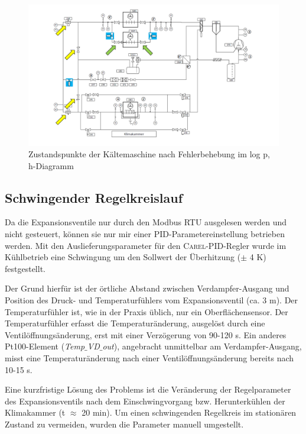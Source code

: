 \begin{figure}[h]
\centering		\includegraphics[page= 36,width=1.05\textwidth]{Pictures/Inbetriebnahme/Inbetriebnahme_Probleme.pdf}
\caption{Zustandspunkte der Kältemaschine nach Fehlerbehebung im log p, h-Diagramm}
\label{fig:KA_OK}
\end{figure}

\newpage
\subsection*{Schwingender Regelkreislauf}

Da die Expansionsventile nur durch den Modbus RTU ausgelesen werden und nicht gesteuert, können sie nur mir einer PID-Parametereinstellung betrieben werden. Mit den Auslieferungsparameter für den \textsc{Carel}-PID-Regler wurde im Kühlbetrieb eine Schwingung um den Sollwert der Überhitzung ($\pm$ 4 K) festgestellt. 

Der Grund hierfür ist der örtliche Abstand zwischen Verdampfer-Ausgang und Position des Druck- und Temperaturfühlers vom Expansionsventil (ca. 3 m). Der Temperaturfühler ist, wie in der Praxis üblich, nur ein Oberflächensensor. Der Temperaturfühler erfasst die Temperaturänderung, ausgelöst durch eine Ventilöffnungsänderung,  erst mit einer Verzögerung von 90-120 s. Ein anderes Pt100-Element (\textit{Temp$\_$VD$\_$out}), angebracht unmittelbar am Verdampfer-Ausgang,  misst eine Temperaturänderung nach einer Ventilöffnungsänderung bereits nach 10-15 s. 

Eine kurzfristige Lösung des Problems ist die Veränderung der Regelparameter des Expansionsventils nach dem Einschwingvorgang bzw. Herunterkühlen der Klimakammer (t $\approx$ 20 min). Um einen schwingenden Regelkreis im stationären Zustand zu vermeiden, wurden die Parameter manuell umgestellt. 

